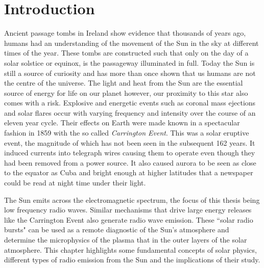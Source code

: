 \doublespacing
\chapter{Introduction}
\label{chap:intro}
Ancient passage tombs in Ireland show evidence that thousands of years ago, humans had an understanding of the movement of the Sun in the sky at different times of the year. These tombs are constructed such that only on the day of a solar solstice or equinox, is the passageway illuminated in full. Today the Sun is still a source of curiosity and has more than once shown that us humans are not the centre of the universe. The light and heat from the Sun are the essential source of energy for life on our planet however, our proximity to this star also comes with a risk. Explosive and energetic events such as coronal mass ejections and solar flares occur with varying frequency and intensity over the course of an eleven year cycle. Their effects on Earth were made known in a spectacular fashion in 1859 with the so called \textit{Carrington Event}. This was a solar eruptive event, the magnitude of which has not been seen in the subsequent 162 years. It induced currents into telegraph wires causing them to operate even though they had been removed from a power source. It also caused aurora to be seen as close to the equator as Cuba and bright enough at higher latitudes that a newspaper could be read at night time under their light. 

The Sun emits across the electromagnetic spectrum, the focus of this thesis being low frequency radio waves. Similar mechanisms that drive large energy releases like the Carrington Event also generate radio wave emission. These ``solar radio bursts" can be used as a remote diagnostic of the Sun's atmosphere and determine the microphysics of the plasma that in the outer layers of the solar atmosphere.
This chapter highlights some fundamental concepts of solar physics, different types of radio emission from the Sun and the implications of their study.

